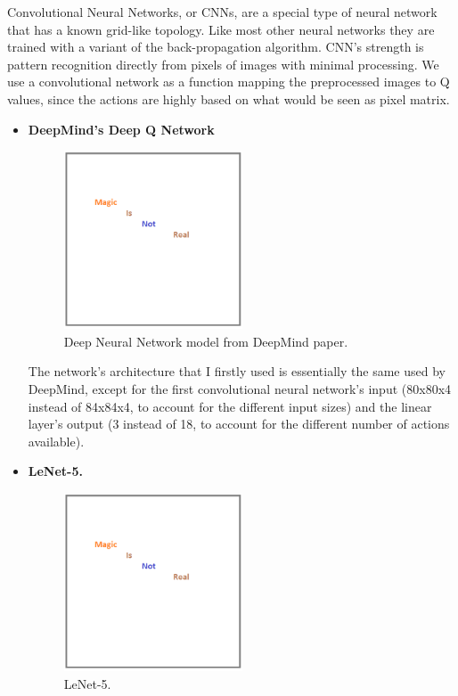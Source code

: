 Convolutional Neural Networks, or CNNs, are a special type of neural network that has a known grid-like topology. Like most other neural networks they are trained with a variant of the back-propagation algorithm. CNN's strength is pattern recognition directly from pixels of images with minimal processing. We use a convolutional network as a function mapping the preprocessed images to Q values, since the actions are highly based on what would be seen as pixel matrix.

\begin{itemize}

	\item \textbf{DeepMind's Deep Q Network}
	
	\begin{figure}[h]
	\centering
	\includegraphics[width=0.5\textwidth]{figs/magic}
	\caption{Deep Neural Network model from DeepMind paper.}
	\end{figure}
	
	The network's architecture that I firstly used is essentially the same used by DeepMind, except for the first convolutional neural network's input (80x80x4 instead of 84x84x4, to account for the different input sizes) and the linear layer's output (3 instead of 18, to account for the different number of actions available).
	
	\item \textbf{LeNet-5.}
	
	\begin{figure}[h]
	\centering
	\includegraphics[width=0.5\textwidth]{figs/magic}
	\caption{LeNet-5.}
	\end{figure}
	

\end{itemize}
